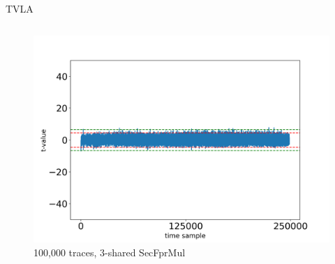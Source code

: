\begin{frame}{TVLA}
\begin{columns}[T]
\begin{figure}
\includegraphics[width=\textwidth]{figure/tvla/SecFprMul_3shares_100k.png}
\vspace{-20pt}
\caption{100,000 traces, 3-shared SecFprMul}
\end{figure}

\end{columns}


\end{frame}



